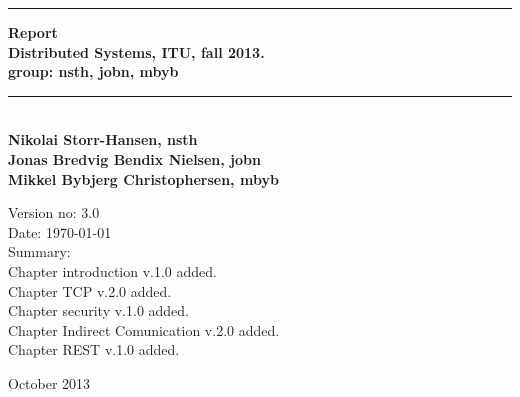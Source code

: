 \begin{titlepage}
\begin{center}
\rule{430pt}{3pt}
 {\huge\bfseries Report\\ }
 {\normalsize\bfseries Distributed Systems, ITU, fall 2013.\\ group: nsth, jobn, mbyb} 
  
 \rule{430pt}{3pt}\\[1cm]
 
 {\normalsize\bfseries Nikolai Storr-Hansen, nsth} \\
 {\normalsize\bfseries Jonas Bredvig Bendix Nielsen, jobn} \\
 {\normalsize\bfseries Mikkel Bybjerg Christophersen, mbyb} \\

 \vspace{2cm}
\end{center}
 

Version no: 3.0 \\

Date: \today \\

Summary: \\

Chapter introduction v.1.0 added.\\

Chapter TCP v.2.0 added.\\

Chapter security v.1.0 added.\\

Chapter Indirect Comunication v.2.0 added.\\

Chapter REST v.1.0 added.\\


\begin{center}

 \vfill
\textsl{}
 \vfill
{October 2013}
\end{center}
\end{titlepage}